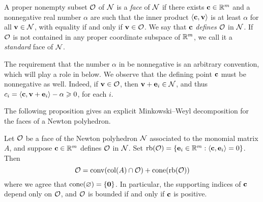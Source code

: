 \documentclass{amsart}
\begin{document}
\begin{definition}[Face]
   \label{defn: face}
   A proper nonempty subset $\mathcal{O}$ of $\mathcal{N}$ is a \emph{face} of $\mathcal{N}$ if there exists $\mathbf{c} \in \mathbb{R}^m$ and a nonnegative real number $\alpha$ are such that the inner product $\langle \mathbf{c}, \mathbf{v} \rangle$ is at least $\alpha$ for all $\mathbf{v} \in \mathcal{N}$, with equality if and only if $\mathbf{v} \in \mathcal{O}$.
   We say that $\mathbf{c}$ \emph{defines} $\mathcal{O}$ in $\mathcal{N}$.
   If $\mathcal{O}$ is not contained in any proper coordinate subspace of $\mathbb{R}^m$, we call it a \emph{standard} face of $\mathcal{N}$.
\end{definition}

\begin{remark}
   \label{rmk: nonnegativity of defining point}
   The requirement that the number $\alpha$ in  be nonnegative is an arbitrary convention, which will play a role in  below.
   We observe that the defining point $\mathbf{c}$ must be nonnegative as well.
   Indeed, if $\mathbf{v} \in \mathcal{O}$, then $\mathbf{v} + \mathbf{e}_i \in \mathcal{N}$, and thus $c_i = \langle \mathbf{c}, \mathbf{v} + \mathbf{e}_i \rangle -\alpha \geqslant 0$, for each $i$.
\end{remark}

The following proposition gives an explicit Minkowski--Weyl decomposition for the faces of a Newton polyhedron.

\begin{proposition}
   \label{prop: MW for faces}
   Let $\mathcal{O}$ be a face of the Newton polyhedron $\mathcal{N}$ associated to the monomial matrix $A$, and suppose $\mathbf{c} \in \mathbb{R}^m$ defines $\mathcal{O}$ in $\mathcal{N}$.
   Set $\operatorname{rb}(\mathcal{O}) =  \{ \mathbf{e}_i \in \mathbb{R}^m : \langle \mathbf{c}, \mathbf{e}_i \rangle = 0\}$.
   Then
   \[\mathcal{O} =  \operatorname{conv}( \operatorname{col}(A) \cap \mathcal{O} ) + \operatorname{cone}(\operatorname{rb}(\mathcal{O}))\]
   where we agree that $\operatorname{cone}(\varnothing) = \{\mathbf{0}\}$.
   In particular, the supporting indices of $\mathbf{c}$ depend only on $\mathcal{O}$, and $\mathcal{O}$ is bounded if and only if $\mathbf{c}$ is positive.
\end{proposition}
\end{document}
